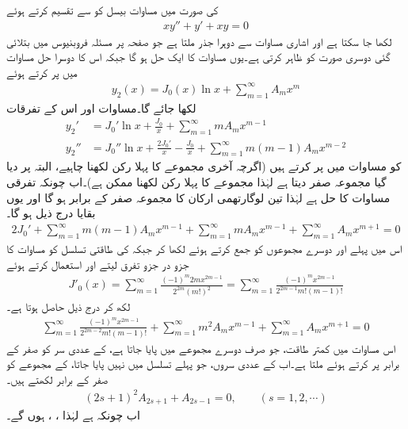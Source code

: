  کی صورت میں مساوات بیسل کو  سے تقسیم کرتے ہوئے
\begin{align}\label{مساوات_بیسل_دوہرا_صفر_الف}
xy''+y'+xy=0
\end{align}
لکھا جا سکتا ہے اور اشاری مساوات  سے دوہرا جذر  ملتا ہے  جو صفحہ  پر مسئلہ فروبنیوس میں بتلائی گئی دوسری صورت کو ظاہر کرتی ہے۔یوں مساوات  کا ایک حل  ہو گا جبکہ اس کا دوسرا حل مساوات  میں  پر کرتے ہوئے  
\begin{align}\label{مساوات_بیسل_دوہرا_صفر_ب}
y_2(x)=J_0(x)\ln x+\sum_{m=1}^{\infty}A_m x^m 
\end{align}
لکھا جائے گا۔مساوات  اور اس کے تفرقات
\begin{align*}
y_2'&=J_0' \ln x+\frac{J_0}{x}+\sum_{m=1}^{\infty}mA_mx^{m-1}\\
y_2''&=J_0''\ln x+\frac{2J_0'}{x}-\frac{J_0}{x}+\sum_{m=1}^{\infty} m(m-1)A_m x^{m-2}
\end{align*}
کو مساوات  میں پر کرتے ہیں (اگرچہ آخری مجموعے کا پہلا رکن  لکھنا چاہیے، البتہ  پر دیا گیا مجموعہ صفر دیتا ہے لہٰذا مجموعے کا پہلا رکن  لکھنا ممکن ہے)۔اب چونکہ  تفرقی مساوات کا حل ہے لہٰذا  تین لوگارتھمی ارکان کا مجموعہ  صفر کے برابر ہو گا اور یوں بقایا درج ذیل ہو گا۔
\begin{align*}
2J_0'+\sum_{m=1}^{\infty}m(m-1)A_mx^{m-1}+\sum_{m=1}^{\infty}mA_mx^{m-1}+\sum_{m=1}^{\infty}A_mx^{m+1}=0
\end{align*}
اس میں پہلے اور دوسرے  مجموعوں کو جمع کرتے ہوئے  لکھا کر جبکہ  کی طاقتی تسلسل کو مساوات  کا جزو در جزو تفرق لیتے اور  استعمال کرتے ہوئے
\begin{align*}
J'_0(x)=\sum_{m=1}^{\infty}\frac{(-1)^m2mx^{2m-1}}{2^{2m}(m!)^2}=\sum_{m=1}^{\infty}\frac{(-1)^mx^{2m-1}}{2^{2m-1}m!(m-1)!}
\end{align*} 
لکھ کر درج ذیل حاصل ہوتا ہے۔
\begin{align}\label{مساوات_بیسل_دوہرا_صفر_پ}
\sum_{m=1}^{\infty}\frac{(-1)^mx^{2m-1}}{2^{2m-2}m!(m-1)!}+\sum_{m=1}^{\infty} m^2A_mx^{m-1}+\sum_{m=1}^{\infty}A_mx^{m+1}=0
\end{align}
اس مساوات میں  کمتر طاقت، جو صرف دوسرے مجموعے میں پایا جاتا ہے، کے عددی سر کو صفر کے برابر پر کرتے ہوئے  ملتا ہے۔اب  کے عددی سروں، جو پہلے تسلسل میں نہیں پایا جاتا، کے مجموعے کو صفر کے برابر لکھتے ہیں۔
\begin{align*}
(2s+1)^2A_{2s+1}+A_{2s-1}=0,\quad \quad (s=1,2,\cdots)
\end{align*}
اب چونکہ  ہے لہٰذا ، ،  ہوں گے۔ 

